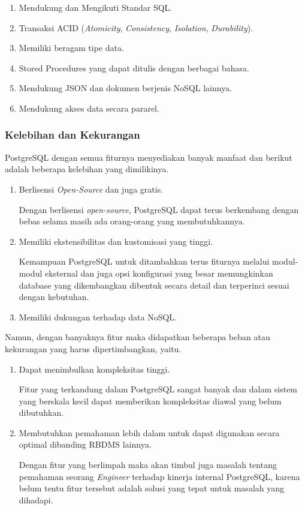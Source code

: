 \documentclass[12pt,a4paper]{article}
\begin{document}
\begin{enumerate}
  \item Mendukung dan Mengikuti Standar SQL.
  \item Transaksi ACID (\emph{Atomicity}, \emph{Consistency}, \emph{Isolation}, \emph{Durability}).
  \item Memiliki beragam tipe data.
  \item \cite{sugianapostgres} Stored Procedures yang dapat ditulis dengan berbagai bahasa.
  \item Mendukung JSON dan dokumen berjenis NoSQL lainnya.
  \item Mendukung akses data secara pararel.
\end{enumerate}

\subsubsection{Kelebihan dan Kekurangan}


PostgreSQL dengan semua fiturnya menyediakan banyak manfaat dan berikut adalah
beberapa kelebihan yang dimilikinya.

\begin{enumerate}[label=\alph*.]

  \item Berlisensi \emph{Open-Source} dan juga gratis.

    Dengan berlisensi  \emph{open-source}, PostgreSQL dapat terus berkembang
    dengan bebas selama masih ada orang-orang yang membutuhkannya.

  \item Memiliki ekstensibilitas dan kustomisasi yang tinggi.

    Kemampuan PostgreSQL untuk ditambahkan terus fiturnya melalui modul-modul
    eksternal dan juga opsi konfigurasi yang besar memungkinkan database yang
    dikembangkan dibentuk secara detail dan terperinci sesuai dengan kebutuhan.

  \item Memiliki dukungan terhadap data NoSQL.
\end{enumerate}

Namun, dengan banyaknya fitur maka didapatkan beberapa beban atau kekurangan
yang harus dipertimbangkan, yaitu.

\begin{enumerate}[label=\alph*.]
  \item Dapat menimbulkan kompleksitas tinggi.

    Fitur yang terkandung dalam PostgreSQL sangat banyak dan dalam sistem yang berskala kecil dapat
    memberikan kompleksitas diawal yang belum dibutuhkan.

  \item Membutuhkan pemahaman lebih dalam untuk dapat digunakan secara optimal dibanding RBDMS lainnya.

    Dengan fitur yang berlimpah maka akan timbul juga masalah tentang pemahaman seorang \emph{Engineer}
    terhadap kinerja internal PostgreSQL, karena belum tentu fitur tersebut adalah solusi yang tepat
    untuk masalah yang dihadapi.

\end{enumerate}
\end{document}
